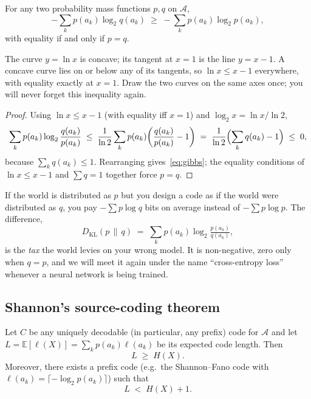 \begin{lemma}
\label{lem:gibbs}
For any two probability mass functions $p, q$ on $\mathcal{A}$,
\begin{equation}
  -\sum_{k} p(a_k) \log_2 q(a_k)
    \;\ge\; -\sum_{k} p(a_k) \log_2 p(a_k),
  \label{eq:gibbs}
\end{equation}
with equality if and only if $p = q$.
\end{lemma}

\begin{aside}
The curve $y = \ln x$ is concave; its tangent at $x = 1$ is the line
$y = x - 1$. A concave curve lies on or below any of its tangents,
so $\ln x \le x - 1$ everywhere, with equality exactly at $x = 1$.
Draw the two curves on the same axes once; you will never forget
this inequality again.
\end{aside}

\begin{proof}
Using $\ln x \le x - 1$ (with equality iff $x = 1$) and
$\log_2 x = \ln x / \ln 2$,
\[
  \sum_k p(a_k) \log_2 \frac{q(a_k)}{p(a_k)}
  \;\le\; \frac{1}{\ln 2}\sum_k p(a_k)\!\left(\frac{q(a_k)}{p(a_k)} - 1\right)
  \;=\; \frac{1}{\ln 2}\Bigl(\sum_k q(a_k) - 1\Bigr) \;\le\; 0,
\]
because $\sum_k q(a_k) \le 1$. Rearranging gives~\eqref{eq:gibbs};
the equality conditions of $\ln x \le x - 1$ and $\sum q = 1$
together force $p = q$.
\end{proof}

\begin{intuition}
If the world is distributed as $p$ but you design a code as if the
world were distributed as $q$, you pay $-\sum p\log q$ bits on
average instead of $-\sum p\log p$. The difference,
\[
  D_{\mathrm{KL}}(p \,\|\, q)
    \;=\; \sum_k p(a_k) \log_2 \tfrac{p(a_k)}{q(a_k)},
\]
is the \emph{tax} the world levies on your wrong model. It is
non-negative, zero only when $q=p$, and we will meet it again under
the name ``cross-entropy loss'' whenever a neural network is being
trained.
\end{intuition}

\subsection*{Shannon's source-coding theorem}

\begin{theorem}
\label{thm:source-coding}
Let $C$ be any uniquely decodable (in particular, any prefix) code
for $\mathcal{A}$ and let $L = \mathbb{E}[\ell(X)] =
\sum_k p(a_k)\ell(a_k)$ be its expected code length. Then
\begin{equation}
  L \;\ge\; H(X).
  \label{eq:source-coding}
\end{equation}
Moreover, there exists a prefix code (e.g.\ the Shannon--Fano code
with $\ell(a_k) = \lceil -\log_2 p(a_k)\rceil$) such that
\begin{equation}
  L \;<\; H(X) + 1.
  \label{eq:source-coding-achiev}
\end{equation}
\end{theorem}


